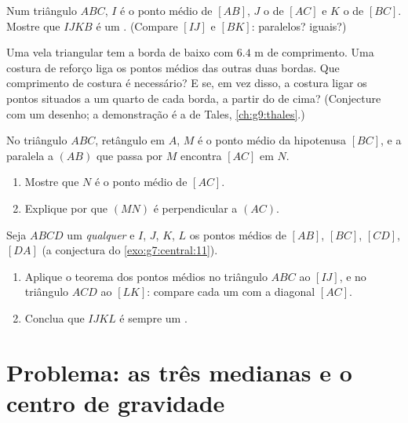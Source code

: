 \begin{exercise}[$\star\star$]\label{exo:g8:midpoints:6}
Num triângulo $ABC$, $I$ é o ponto médio de $[AB]$, $J$ o de $[AC]$ e
$K$ o de $[BC]$. Mostre que $IJKB$ é um . (Compare $[IJ]$
e $[BK]$: paralelos? iguais?)
\end{exercise}

\begin{exercise}[$\star\star$]\label{exo:g8:midpoints:7}
Uma vela triangular tem a borda de baixo com $6.4$ m de comprimento.
Uma costura de reforço liga os pontos médios das outras duas bordas. Que
comprimento de costura é necessário? E se, em vez disso, a costura
ligar os pontos situados a um quarto de cada borda, a partir do 
de cima? (Conjecture com um desenho; a demonstração é a de Tales,
\cref{ch:g9:thales}.)
\end{exercise}

\begin{exercise}[$\star\star$]\label{exo:g8:midpoints:8}
No triângulo $ABC$, retângulo em $A$, $M$ é o ponto médio da hipotenusa
$[BC]$, e a paralela a $(AB)$ que passa por $M$ encontra $[AC]$ em
$N$.
\begin{enumerate}
  \item Mostre que $N$ é o ponto médio de $[AC]$.
  \item Explique por que $(MN)$ é perpendicular a $(AC)$.
\end{enumerate}
\end{exercise}

\begin{exercise}[$\star\star\star$]\label{exo:g8:midpoints:9}
Seja $ABCD$ um  \emph{qualquer} e $I$, $J$, $K$, $L$ os
pontos médios de $[AB]$, $[BC]$, $[CD]$, $[DA]$ (a conjectura do
\cref{exo:g7:central:11}).
\begin{enumerate}
  \item Aplique o teorema dos pontos médios no triângulo $ABC$ ao
         $[IJ]$, e no triângulo $ACD$ ao  $[LK]$:
        compare cada um com a diagonal $[AC]$.
  \item Conclua que $IJKL$ é sempre um .
\end{enumerate}
\end{exercise}

\section{Problema: as três medianas e o centro de gravidade}

